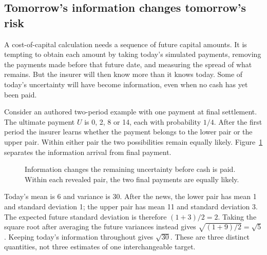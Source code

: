 \subsection{Tomorrow's information changes tomorrow's risk}

A cost-of-capital calculation needs a sequence of future capital amounts.
It is tempting to obtain each amount by taking today's simulated payments,
removing the payments made before that future date, and measuring the spread
of what remains. But the insurer will then know more than it knows today.
Some of today's uncertainty will have become information, even when no cash
has yet been paid.

Consider an authored two-period example with one payment at final settlement.
The ultimate payment $U$ is 0, 2, 8 or 14, each with probability $1/4$.
After the first period the insurer learns whether the payment belongs to
the lower pair or the upper pair. Within either pair the two possibilities
remain equally likely. Figure~\ref{fig:reserve-information} separates the
information arrival from final payment.

\begin{figure}[htbp]
\centering
{}
\caption{Information changes the remaining uncertainty before cash is paid.
 Within each revealed pair, the two final payments are equally likely.}
\label{fig:reserve-information}
\end{figure}

Today's mean is 6 and variance is 30. After the news, the lower pair has mean
1 and standard deviation 1; the upper pair has mean 11 and standard deviation
3. The expected future standard deviation is therefore $(1+3)/2=2$.
Taking the square root after averaging the future variances instead gives
$\sqrt{(1+9)/2}=\sqrt5$. Keeping today's information throughout gives
$\sqrt{30}$. These are three distinct quantities, not three estimates of
one interchangeable target.

